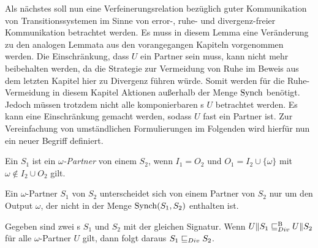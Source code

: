 Als nächstes soll nun eine Verfeinerungsrelation bezüglich guter Kommunikation
von Transitionssystemen im Sinne von error-, ruhe- und divergenz-freier
Kommunikation betrachtet werden. Es muss in diesem Lemma eine Veränderung zu
den analogen Lemmata aus den vorangegangen Kapiteln vorgenommen werden. Die
Einschränkung, dass $U$ ein Partner sein muss, kann nicht mehr beibehalten
werden, da die Strategie zur Vermeidung von Ruhe im Beweis aus dem letzten
Kapitel hier zu Divergenz führen würde. Somit werden für die Ruhe-Vermeidung in
diesem Kapitel Aktionen außerhalb der Menge $\mathrm{Synch}$
benötigt. Jedoch müssen trotzdem nicht alle komponierbaren \EIO{}s $U$ betrachtet
werden. Es kann eine Einschränkung gemacht werden, sodass $U$ fast ein
Partner ist. Zur Vereinfachung von umständlichen Formulierungen im Folgenden wird hierfür
nun ein neuer Begriff definiert.

\begin{Def}
  Ein \EIO{} $S_1$ ist ein \emph{$\omega$-Partner} von einem \EIO{} $S_2$, wenn
  $I_1=O_2$ und $O_1=I_2\cup\{\omega\}$ mit $\omega\notin I_2\cup O_2$ gilt.
\end{Def}

Ein $\omega$-Partner $S_1$ von $S_2$ unterscheidet sich von einem Partner von
$S_2$ nur um den Output $\omega$, der nicht in der Menge $\mathrm{Synch}(S_1,S_2)$
enthalten ist.

\begin{lem}
\label{lemDivVerfeinerung}
  Gegeben sind zwei \EIO{}s $S_1$ und $S_2$ mit der gleichen Signatur. Wenn
  $U\|S_1\sqsubseteq _{Div}^\mathrm{B}{} U\|S_2$ für alle $\omega$-Partner $U$ gilt, dann folgt daraus
  $S_1\sqsubseteq _{Div}{} S_2$.
\end{lem}


